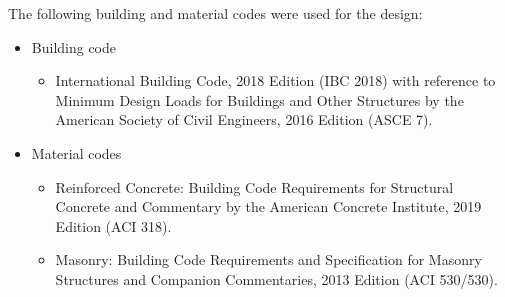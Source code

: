 The following building and material codes were used for the design:
\begin{itemize}
\item {Building code}
  \begin{itemize}
  \item International Building Code, 2018 Edition (IBC 2018) with reference to Minimum Design Loads for Buildings and Other Structures by the American Society of Civil Engineers, 2016 Edition (ASCE 7).
    \end{itemize}
\item {Material codes}
  \begin{itemize}
  \item Reinforced Concrete: Building Code Requirements for Structural Concrete and Commentary by the American Concrete Institute, 2019 Edition (ACI 318).
    \item Masonry: Building Code Requirements and Specification for Masonry Structures and Companion Commentaries, 2013 Edition (ACI 530/530).
    \end{itemize}
\end{itemize}  

